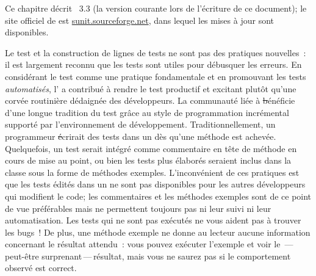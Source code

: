 \documentclass[a4paper,10pt,twoside]{book}
\begin{document}
Ce chapitre décrit \SUnit~3.3 (la version courante lors de l'écriture de ce document); le site officiel de \sunit est \url{sunit.sourceforge.net}, dans lequel les mises à jour sont disponibles.

Le test et la construction de lignes de tests ne sont pas des pratiques nouvelles~: il est largement reconnu que les tests sont utiles pour débusquer les erreurs. En considérant le test comme une pratique fondamentale et en promouvant les tests \emph{automatisés}, l'\mbox{} a contribué à rendre le test productif et excitant plutôt qu'une corvée routinière dédaignée des développeurs. La communauté liée à \st bénéficie d'une longue tradition du test grâce au style de programmation incrémental supporté par l'environnement de développement.
Traditionnellement, un programmeur \st écrirait des tests dans un  dès qu'une méthode est achevée. Quelquefois, un test serait intégré comme commentaire en tête de méthode en cours de mise au point, ou bien les tests plus élaborés seraient inclus dans la classe sous la forme de méthodes exemples. L'inconvénient de ces pratiques est que les tests édités dans un  ne sont pas disponibles pour les autres développeurs qui modifient le code; les commentaires et les méthodes exemples sont de ce point de vue préférables mais ne permettent toujours pas ni leur suivi ni leur automatisation. 
Les tests qui ne sont pas exécutés ne vous aident pas à trouver les bugs~! De plus, une méthode exemple ne donne au lecteur aucune information concernant le résultat attendu~: vous pouvez exécuter l'exemple et voir le \,---\,peut-être surprenant\,---\,résultat, mais vous ne saurez pas si le comportement observé est correct.
\end{document}

